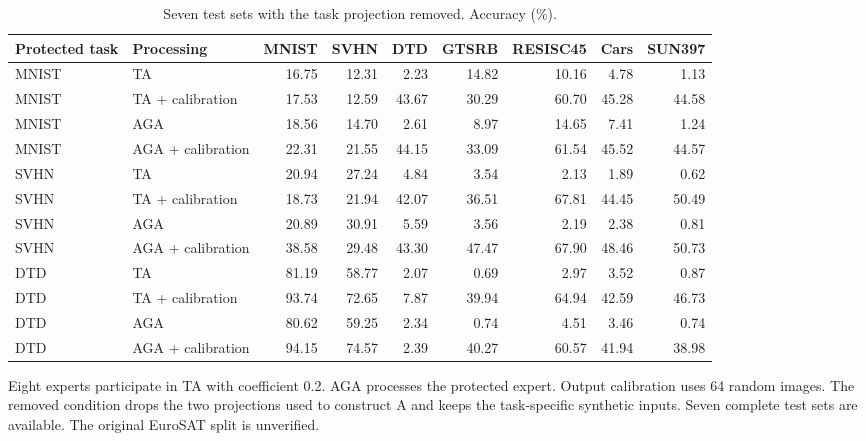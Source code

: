 \begin{table}[t]
\centering\small
\setlength{\tabcolsep}{4pt}
\caption{Seven test sets with the task projection removed. Accuracy (\%).}
\label{tab:defense2_projection_eight_datasets}
\begin{tabular}{@{}llrrrrrrr@{}}
\toprule
Protected task & Processing & MNIST & SVHN & DTD & GTSRB & RESISC45 & Cars & SUN397 \\
\midrule
MNIST & TA & 16.75 & 12.31 & 2.23 & 14.82 & 10.16 & 4.78 & 1.13 \\
MNIST & TA + calibration & 17.53 & 12.59 & 43.67 & 30.29 & 60.70 & 45.28 & 44.58 \\
MNIST & AGA & 18.56 & 14.70 & 2.61 & 8.97 & 14.65 & 7.41 & 1.24 \\
MNIST & AGA + calibration & 22.31 & 21.55 & 44.15 & 33.09 & 61.54 & 45.52 & 44.57 \\
\midrule
SVHN & TA & 20.94 & 27.24 & 4.84 & 3.54 & 2.13 & 1.89 & 0.62 \\
SVHN & TA + calibration & 18.73 & 21.94 & 42.07 & 36.51 & 67.81 & 44.45 & 50.49 \\
SVHN & AGA & 20.89 & 30.91 & 5.59 & 3.56 & 2.19 & 2.38 & 0.81 \\
SVHN & AGA + calibration & 38.58 & 29.48 & 43.30 & 47.47 & 67.90 & 48.46 & 50.73 \\
\midrule
DTD & TA & 81.19 & 58.77 & 2.07 & 0.69 & 2.97 & 3.52 & 0.87 \\
DTD & TA + calibration & 93.74 & 72.65 & 7.87 & 39.94 & 64.94 & 42.59 & 46.73 \\
DTD & AGA & 80.62 & 59.25 & 2.34 & 0.74 & 4.51 & 3.46 & 0.74 \\
DTD & AGA + calibration & 94.15 & 74.57 & 2.39 & 40.27 & 60.57 & 41.94 & 38.98 \\
\bottomrule
\end{tabular}
\par\smallskip
\begin{minipage}{\textwidth}\footnotesize Eight experts participate in TA with coefficient 0.2. AGA processes the protected expert. Output calibration uses 64 random images. The removed condition drops the two projections used to construct A and keeps the task-specific synthetic inputs. Seven complete test sets are available. The original EuroSAT split is unverified.\end{minipage}
\end{table}
